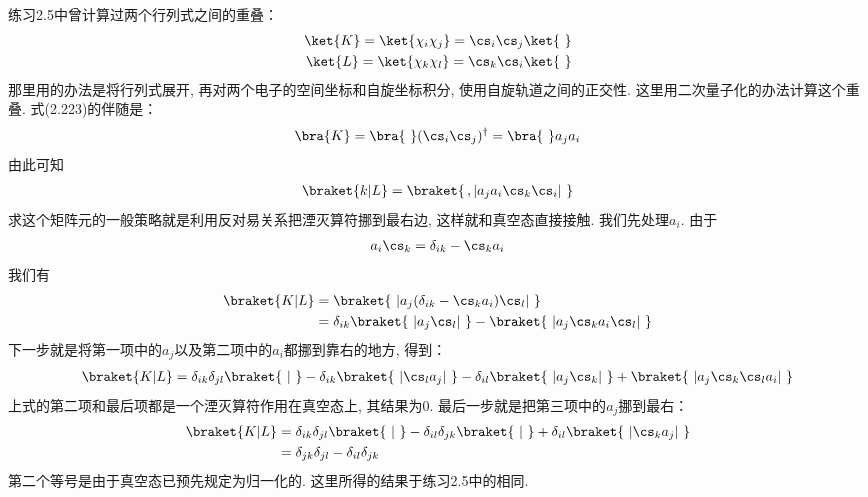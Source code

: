 练习2.5中曾计算过两个行列式之间的重叠：
\begin{align}
\ket{K} = \ket{\chi_i\chi_j} = \cs_i\cs_j\ket{\,\,}\\
\ket{L} = \ket{\chi_k\chi_l} = \cs_k\cs_i\ket{\,\,}
\end{align}
那里用的办法是将行列式展开, 
再对两个电子的空间坐标和自旋坐标积分, 
使用自旋轨道之间的正交性. 
这里用二次量子化的办法计算这个重叠. 
式(2.223)的伴随是：
\begin{align}
\bra{K} = \bra{\,\,}(\cs_i\cs_j)^\dagger = \bra{\,\,}a_ja_i
\end{align}
由此可知
\begin{align}
\braket{k|L} = \braket{\,,|a_ja_i\cs_k\cs_i|\,\,}
\end{align}
求这个矩阵元的一般策略就是利用反对易关系把湮灭算符挪到最右边, 
这样就和真空态直接接触. 
我们先处理$a_i$. 
由于
\begin{align}
a_i\cs_k = \delta_{ik} - \cs_ka_i
\end{align}
我们有
\begin{align}
\braket{K|L} & = \braket{\,\,|a_j(\delta_{ik}-\cs_ka_i)\cs_l|\,\,}\\
             & = \delta_{ik}\braket{\,\,|a_j\cs_l|\,\,} - \braket{\,\,|a_j\cs_ka_i\cs_l|\,\,}
\end{align}
下一步就是将第一项中的$a_j$以及第二项中的$a_i$都挪到靠右的地方, 
得到：
\begin{align}
\braket{K|L} = \delta_{ik}\delta_{jl} \braket{\,\,|\,\,} - \delta_{ik}\braket{\,\,|\cs_la_j|\,\,} - \delta_{il}\braket{\,\,|a_j\cs_k|\,\,} + \braket{\,\,|a_j\cs_k\cs_la_i|\,\,}
\end{align}
上式的第二项和最后项都是一个湮灭算符作用在真空态上, 
其结果为$0$. 
最后一步就是把第三项中的$a_j$挪到最右：
\begin{align}
\braket{K|L} & = \delta_{ik}\delta_{jl} \braket{\,\,|\,\,} - \delta_{il}\delta_{jk}\braket{\,\,|\,\,} + \delta_{il}\braket{\,\,|\cs_ka_j|\,\,}\notag\\
& = \delta_{jk}\delta_{jl} - \delta_{il}\delta_{jk}
\end{align}
第二个等号是由于真空态已预先规定为归一化的. 
这里所得的结果于练习2.5中的相同. 

